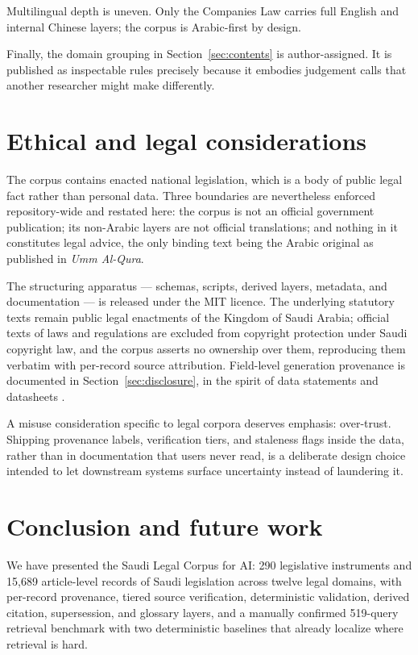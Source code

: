 \documentclass[sn-basic]{sn-jnl}%
\newcommand{\corpusname}{Saudi Legal Corpus for AI}
\begin{document}
Multilingual depth is uneven. Only the Companies Law carries full English and
internal Chinese layers; the corpus is Arabic-first by design.

Finally, the domain grouping in Section~\ref{sec:contents} is
author-assigned. It is published as inspectable rules precisely because it
embodies judgement calls that another researcher might make differently.

\section{Ethical and legal considerations}
\label{sec:ethics}

The corpus contains enacted national legislation, which is a body of public
legal fact rather than personal data. Three boundaries are nevertheless
enforced repository-wide and restated here: the corpus is not an official
government publication; its non-Arabic layers are not official translations;
and nothing in it constitutes legal advice, the only binding text being the
Arabic original as published in \emph{Umm Al-Qura}.

The structuring apparatus --- schemas, scripts, derived layers, metadata,
and documentation --- is released under the MIT licence. The underlying
statutory texts remain public legal enactments of the Kingdom of Saudi
Arabia; official texts of laws and regulations are excluded from copyright
protection under Saudi copyright law, and the corpus asserts no ownership
over them, reproducing them verbatim with per-record source attribution.
Field-level generation provenance is documented in
Section~\ref{sec:disclosure}, in the spirit of data statements and
datasheets \citep{bender2018data, gebru2021datasheets}.

A misuse consideration specific to legal corpora deserves emphasis:
over-trust. Shipping provenance labels, verification tiers, and staleness
flags inside the data, rather than in documentation that users never read,
is a deliberate design choice intended to let downstream systems surface
uncertainty instead of laundering it.

\section{Conclusion and future work}
\label{sec:conclusion}

We have presented the \corpusname: 290 legislative instruments and 15{,}689
article-level records of Saudi legislation across twelve legal domains, with
per-record provenance, tiered source verification, deterministic validation,
derived citation, supersession, and glossary layers, and a manually
confirmed 519-query retrieval benchmark with two deterministic baselines
that already localize where retrieval is hard.
\end{document}
